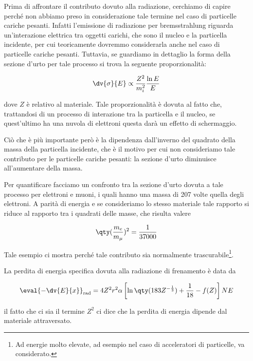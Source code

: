 Prima di affrontare il contributo dovuto alla radiazione, cerchiamo di capire perché non abbiamo preso in considerazione tale termine nel caso di particelle cariche pesanti. Infatti l'emissione di radiazione per bremsstrahlung riguarda un'interazione elettrica tra oggetti carichi, che sono il nucleo e la particella incidente, per cui teoricamente dovremmo considerarla anche nel caso di particelle cariche pesanti. Tuttavia, se guardiamo in dettaglio la forma della sezione d'urto per tale processo si trova la seguente proporzionalità:

\begin{equation*}
    \dv{\sigma}{E} \propto \frac{Z^2}{m_i^2} \frac{\ln{E}}{E}
\end{equation*}

dove $Z$ è relativo al materiale. Tale proporzionalità è dovuta al fatto che, trattandosi di un processo di interazione tra la particella e il nucleo, se quest'ultimo ha una nuvola di elettroni questa darà un effetto di schermaggio.

Ciò che è più importante però è la dipendenza dall'inverno del quadrato della massa della particella incidente, che è il motivo per cui non consideriamo tale contributo per le particelle cariche pesanti: la sezione d'urto diminuisce all'aumentare della massa.

Per quantificare facciamo un confronto tra la sezione d'urto dovuta a tale processo per elettroni e muoni, i quali hanno una massa di 207 volte quella degli elettroni. A parità di energia e se consideriamo lo stesso materiale tale rapporto si riduce al rapporto tra i quadrati delle masse, che risulta valere

\begin{equation*}
    \qty(\frac{m_{e}}{m_{\mu}})^2
    =\frac{1}{37000}
\end{equation*}

Tale esempio ci mostra perché tale contributo sia normalmente trascurabile\footnote{Ad energie molto elevate, ad esempio nel caso di acceleratori di particelle, va considerato.}.

La perdita di energia specifica dovuta alla radiazione di frenamento è data da

\begin{equation*}
    \eval{-\dv{E}{x}}_{\rm rad}
    =4 Z^2 r^2 \alpha \left[ \ln{\qty(183Z^{-\frac{1}{3}})} + \frac{1}{18} - f(Z) \right]NE
\end{equation*}

il fatto che ci sia il termine $Z^2$ ci dice che la perdita di energia dipende dal materiale attraversato.

